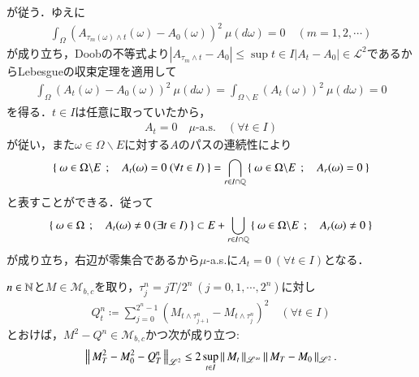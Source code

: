 \begin{prf}
		が従う．ゆえに
		\begin{align}
			\int_\Omega \left( A_{\tau_m(\omega) \wedge t}(\omega) - A_{0}(\omega) \right)^2\ \mu(d\omega) = 0 \quad (m=1,2,\cdots)
		\end{align}
		が成り立ち，Doobの不等式より$|A_{\tau_m \wedge t} - A_{0}| \leq \sup{t \in I}{|A_t - A_{0}|} \in \mathscr{L}^2$であるからLebesgueの収束定理を適用して
		\begin{align}
			\int_\Omega \left( A_t(\omega) - A_{0}(\omega) \right)^2\ \mu(d\omega) 
			= \int_{\Omega \backslash E} \left( A_t(\omega) \right)^2\ \mu(d\omega)
			= 0
		\end{align}
		を得る．$t \in I$は任意に取っていたから，
		\begin{align}
			A_t = 0 \quad \mbox{$\mu$-a.s.} \quad (\forall t \in I)
		\end{align}
		が従い，また$\omega \in \Omega \backslash E$に対する$A$のパスの連続性により
		\begin{align}
			\Set{\omega \in \Omega \backslash E}{A_t(\omega) = 0\ (\forall t \in I)}
			= \bigcap_{r \in I \cap \Q} \Set{\omega \in \Omega \backslash E}{A_r(\omega) = 0}
		\end{align}
		と表すことができる．従って
		\begin{align}
			\left\{\ \omega \in \Omega\ \, ; \quad A_t(\omega) \neq 0\ (\exists t \in I)\ \right\}
			\subset E + \bigcup_{r \in I \cap \mathbb{Q}} \left\{\ \omega \in \Omega \backslash E\ \, ; \quad A_r(\omega) \neq 0\ \right\}
		\end{align}
		が成り立ち，右辺が零集合であるから$\mu$-a.s.に$A_t = 0\ (\forall t \in I)$となる．
		\QED
	\end{prf}
	
	\begin{screen}
		\begin{lem}[二次変分補題]
			$n \in \mathbb{N}$と$M \in \mathcal{M}_{b,c}$を取り，$\tau_j^n = jT/2^n\ (j=0,1,\cdots,2^n)$に対し
			\begin{align}
				Q_t^n \coloneqq \sum_{j=0}^{2^n-1} \left( M_{t \wedge \tau_{j+1}^n} - M_{t \wedge \tau_j^n} \right)^2 \quad (\forall t \in I)
				\label{eq:lem_quadratic_variation_0}
			\end{align}
			とおけば，$M^2 - Q^n \in \mathcal{M}_{b,c}$かつ次が成り立つ:
			\begin{align}
				\left\|\, M_T^2 - M_0^2 - Q_T^n\, \right\|_{\mathscr{L}^2} \leq 2 \operatorname*{sup}_{t \in I} \left\|\, M_t\, \right\|_{\mathscr{L}^\infty} \left\|\, M_T - M_0\, \right\|_{\mathscr{L}^2}.
			\end{align}
			\label{lem:quadratic_variation}
		\end{lem}
	\end{screen}
	
